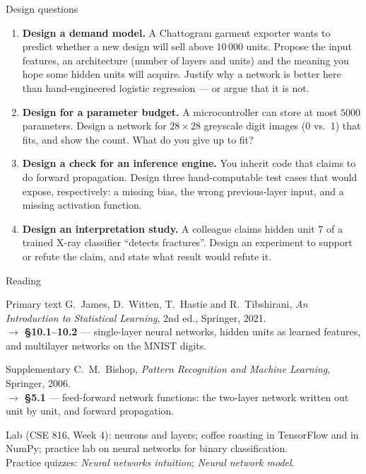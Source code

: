\documentclass[aspectratio=169,10pt]{beamer}
\begin{document}
\begin{frame}{Design questions}
  \footnotesize
  \begin{enumerate}
    \item \textbf{Design a demand model.} A Chattogram garment exporter wants to predict
          whether a new design will sell above 10\,000 units. Propose the input features, an
          architecture (number of layers and units) and the meaning you hope some hidden units
          will acquire. Justify why a network is better here than hand-engineered logistic
          regression --- or argue that it is not. \hfill{}
    \item \textbf{Design for a parameter budget.} A microcontroller can store at most $5000$
          parameters. Design a network for $28\times28$ greyscale digit images (0 vs.\ 1)
          that fits, and show the count. What do you give up to fit? \hfill{}
    \item \textbf{Design a check for an inference engine.} You inherit code that claims to do
          forward propagation. Design three hand-computable test cases that would expose,
          respectively: a missing bias, the wrong previous-layer input, and a missing
          activation function. \hfill{}
    \item \textbf{Design an interpretation study.} A colleague claims hidden unit 7 of a
          trained X-ray classifier ``detects fractures''. Design an experiment to support or
          refute the claim, and state what result would refute it. \hfill{}
  \end{enumerate}
\end{frame}

\begin{frame}{Reading}
  \begin{block}{Primary text}
    G.~James, D.~Witten, T.~Hastie and R.~Tibshirani,
    \emph{An Introduction to Statistical Learning}, 2nd ed., Springer, 2021.\\[2pt]
    \hfill{\small$\rightarrow$ \textbf{\S10.1--10.2} --- single-layer neural networks, hidden
    units as learned features, and multilayer networks on the MNIST digits.}
  \end{block}
  \begin{block}{Supplementary}
    C.~M.~Bishop, \emph{Pattern Recognition and Machine Learning}, Springer, 2006.\\[2pt]
    \hfill{\small$\rightarrow$ \textbf{\S5.1} --- feed-forward network functions: the
    two-layer network written out unit by unit, and forward propagation.}
  \end{block}
  \vspace{1mm}
  \begin{center}
    \small\color{cugray}
    Lab (CSE 816, Week 4): neurons and layers; coffee roasting in TensorFlow and in NumPy;
    practice lab on neural networks for binary classification.\\
    Practice quizzes: \emph{Neural networks intuition}; \emph{Neural network model}.
  \end{center}
\end{frame}
\end{document}
